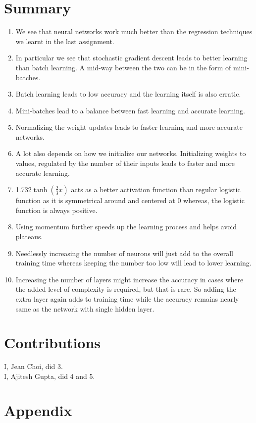 \documentclass[11pt,twoside]{article}
\begin{document}
\section{Summary}
\begin{enumerate}[label=(\alph*)]
\item We see that neural networks work much better than the regression techniques we learnt in the last assignment.
\item In particular we see that stochastic gradient descent leads to better learning than batch learning. A mid-way between the two can be in the form of mini-batches.
\item Batch learning leads to low accuracy and the learning itself is also erratic.
\item Mini-batches lead to a balance between fast learning and accurate learning.
\item Normalizing the weight updates leads to faster learning and more accurate networks.
\item A lot also depends on how we initialize our networks. Initializing weights to values, regulated by the number of their inputs leads to faster and more accurate learning.
\item 1.732$ \tanh(\frac{2}{3}x)$ acts as a better activation function than regular logistic function as it is symmetrical around and centered at 0 whereas, the logistic function is always positive.
\item Using momentum further speeds up the learning process and helps avoid plateaus.
\item Needlessly increasing the number of neurons will just add to the overall training time whereas keeping the number too low will lead to lower learning.
\item Increasing the number of layers might increase the accuracy in cases where the added level of complexity is required, but that is rare. So adding the extra layer again adds to training time while the accuracy remains nearly same as the network with single hidden layer.
\end{enumerate}

\section{Contributions}

I, Jean Choi, did 3.\\
I, Ajitesh Gupta, did 4 and 5.\\

\section*{Appendix}

\end{document}
